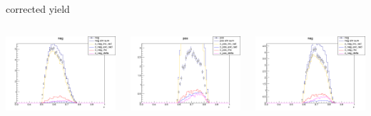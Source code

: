 \begin{frame}{corrected yield}
\begin{columns}
\begin{column}[T]{0.25\textwidth}
\includegraphics[width = \textwidth]{results/yield/statistics_corr/yield_x_Q2_z_0.50_5.000_0.60_neg.png}
\end{column}
\begin{column}[T]{0.25\textwidth}
\includegraphics[width = \textwidth]{results/yield/statistics_corr/yield_x_Q2_z_0.50_5.000_0.70_pos.png}
\end{column}
\begin{column}[T]{0.25\textwidth}
\includegraphics[width = \textwidth]{results/yield/statistics_corr/yield_x_Q2_z_0.50_5.000_0.70_neg.png}
\end{column}
\end{columns}
\end{frame}
